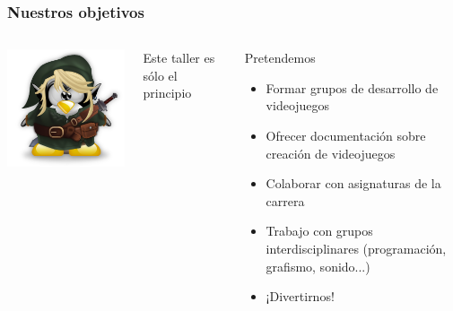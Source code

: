 \documentclass{beamer}
\begin{document}
	
\begin{frame}
	\frametitle{Nuestros objetivos}
	
	\begin{columns}[c]
		\column{75pt}
		\begin{center}
			\includegraphics[scale=0.3]{img/link.png}
		\end{center}
		\column{225pt}
		
		\begin{center}
			Este taller es sólo el principio
		\end{center}		
		
		\begin{block}{Pretendemos}
            \begin{itemize}
                \item Formar grupos de desarrollo de videojuegos
				\item Ofrecer documentación sobre creación de videojuegos
				\item Colaborar con asignaturas de la carrera
				\item Trabajo con grupos interdisciplinares (programación, grafismo, sonido...)
				\item ¡Divertirnos!
            \end{itemize}            
        \end{block}        
	\end{columns}
\end{frame}
\end{document}
